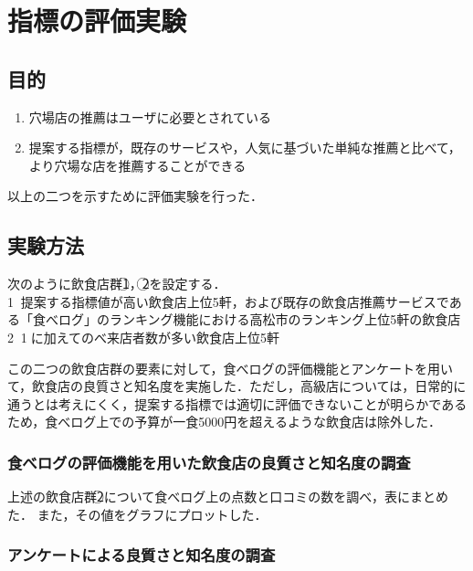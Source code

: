 \chapter{指標の評価実験}

\newcommand{\ctext}[1]{\textcircled{\scriptsize #1}}

\label{chap:experiment}

\section{目的}
		\begin{enumerate}
			\item 穴場店の推薦はユーザに必要とされている
			\item 提案する指標が，既存のサービスや，人気に基づいた単純な推薦と比べて，より穴場な店を推薦することができる
		\end{enumerate}
以上の二つを示すために評価実験を行った．
\section{実験方法}

次のように飲食店群\ctext{1}，\ctext{2}を設定する．\\
	\ctext{1}：提案する指標値が高い飲食店上位5軒，および既存の飲食店推薦サービスである「食べログ」のランキング機能における高松市のランキング上位5軒の飲食店\\
	\ctext{2}：\ctext{1}に加えてのべ来店者数が多い飲食店上位5軒\par
	この二つの飲食店群の要素に対して，食べログの評価機能とアンケートを用いて，飲食店の良質さと知名度を実施した．ただし，高級店については，日常的に通うとは考えにくく，提案する指標では適切に評価できないことが明らかであるため，食べログ上での予算が一食5000円を超えるような飲食店は除外した．
	\subsection{食べログの評価機能を用いた飲食店の良質さと知名度の調査}\label{exp:scrutiny}

		上述の飲食店群\ctext{2}について食べログ上の点数と口コミの数を調べ，表にまとめた．
		また，その値をグラフにプロットした．

	\subsection{アンケートによる良質さと知名度の調査}\label{exp:questionnaire}

